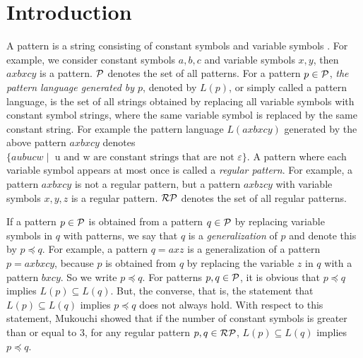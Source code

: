 \section{Introduction}

A pattern is a string consisting of constant symbols and variable symbols \cite{Angluin1980a,Angluin1980b}.
For example, we consider constant symbols $a,b,c$ and variable symbols $x,y$,  then $axbxcy$ is a pattern.
$\mathcal{P}$ denotes the set of all patterns.
For a pattern $p\in \mathcal{P}$, {\it the pattern language generated by $p$}, denoted by $L(p)$, or simply called a pattern language, is the set of all strings obtained by replacing all variable symbols with constant symbol strings, where the same variable symbol is replaced by the same constant string.
For example the pattern language $L(axbxcy)$ generated by the above pattern $axbxcy$ denotes $\{ aubucw \mid \mbox{  u and w are constant strings that are not $\varepsilon$} \}$.
A pattern where each variable symbol appears at most once is called a {\it regular pattern}. 
For example, a pattern $axbxcy$ is not a regular pattern, but a pattern $axbzcy$ with variable symbols $x,y,z$ is a regular pattern.
$\mathcal{RP}$ denotes the set of all regular patterns.

If a pattern $p\in \mathcal{P}$ is obtained from a pattern $q\in\mathcal{P}$ by replacing variable symbols in $q$ with patterns, we say that $q$ is a {\it generalization} of $p$ and denote this by $p\preceq q$.
For example, a pattern $q=axz$ is a generalization of a pattern $p=axbxcy$, because $p$ is obtained from $q$ by replacing the variable $z$ in $q$ with a pattern $bxcy$.
So we write $p\preceq q$.
For patterns $p,q\in \mathcal{P}$, it is obvious that $p\preceq q$ implies $L(p)\subseteq L(q)$.
But, the converse, that is, the statement that  $L(p)\subseteq L(q)$ implies $p\preceq q$ does not always hold.
With respect to this statement, Mukouchi \cite{Mukouchi1991} showed that if the number of constant symbols is greater than or equal to 3, for any regular pattern $p,q\in \mathcal{RP}$, $L(p)\subseteq L(q)$ implies $p\preceq q$.

